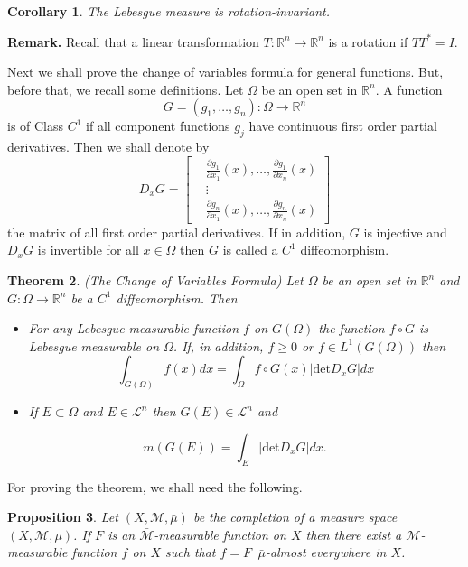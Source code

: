\documentclass[12pt]{report}
\newtheorem{theorem}{Theorem}[section]
\newtheorem{corollary}[theorem]{Corollary}
\newtheorem{prop}[theorem]{Proposition}
\begin{document}
\begin{corollary}  The Lebesgue measure is
rotation-invariant.
\end{corollary}

{\bf Remark.} Recall that a linear transformation
 $T:\mathbb{R}^n\to \mathbb{R}^n$ is a rotation
if $TT^*=I$.

\vspace{.15cm}
\noindent
 Next we shall prove the change of variables
formula for general functions.  But, before that, we recall some
definitions.  Let $\Omega$ be an open set in $\mathbb{R}^n$.  A
function
\[
G = (g_1, \dots, g_n): \Omega \longrightarrow \mathbb{R}^n
\]
is of Class $C^1$ if all component functions $g_j$ have
continuous first order partial derivatives.  Then we shall
denote by
\[ D_x G = \left [
\begin{array}{ll}
&\frac{\partial g_1}{\partial x_1}(x), \dots, \frac{\partial
g_1}{\partial x_n}(x)\\
&\vdots\\
&\frac{\partial g_n}{\partial x_1}(x), \dots, \frac{\partial
g_n}{\partial x_n}(x) \end{array} \right ]
\]
the matrix of all first order partial derivatives.  If in addition,
$G$ is injective and $D_x G$  is invertible for all $x \in \Omega$
then $G$ is called a $C^1$ diffeomorphism.

\begin{theorem} (The Change of Variables Formula) 
Let $\Omega$ be an open set in $\mathbb{R}^n$ and $G:
\Omega \longrightarrow \mathbb{R}^n$ be a $C^1$
diffeomorphism.  Then
\begin{itemize}
\item[(a)]  For any Lebesgue measurable function $f$
on $G(\Omega)$ the function $f \circ G$ is Lebesgue measurable
on $\Omega$.  If, in addition, $f \ge 0 $ or $f \in L^1
(G(\Omega))$ then
\[
\int_{G(\Omega)} f(x) dx = \int_\Omega f \circ G(x)
|\mbox{det} D_x G| dx
\]
\item[(b)]  If $E \subset \Omega$ and $E \in
\mathcal{L}^n$ then $G (E) \in \mathcal{L}^n$ and
\end{itemize}
\[
m(G(E)) = \int_E |\mbox{det} D_x G| dx.
\]
\end{theorem}
For proving the theorem, we shall need the following.

\begin{prop}  Let $(X, \mathcal{M}, \bar \mu)$ be the
completion of a measure space $(X, \mathcal{M}, \mu)$.   If $F$
is an $\bar{\mathcal{M}}$-measurable function on $X$ then there
exist a $\mathcal{M}$-measurable function $f $ on $X$ such that
$f = F$\, $\bar\mu$-almost everywhere in $X$.
\end{prop}
\end{document}
